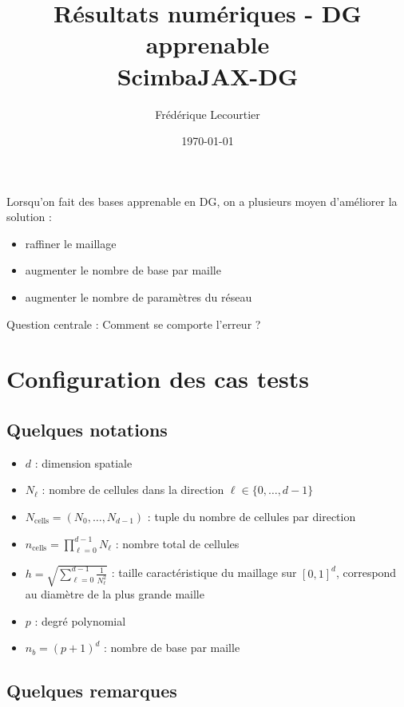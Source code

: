 \documentclass[12pt,a4paper]{article}
\title{\textbf{Résultats numériques - DG apprenable}\\
\large ScimbaJAX-DG}
\author{Frédérique Lecourtier}
\date{\today}
\begin{document}
\maketitle

Lorsqu'on fait des bases apprenable en DG, on a plusieurs moyen d'améliorer la solution :
\begin{itemize}
    \item raffiner le maillage
    \item augmenter le nombre de base par maille
    \item augmenter le nombre de paramètres du réseau
\end{itemize}

Question centrale : Comment se comporte l'erreur ?

\tableofcontents

\newpage
\section{Configuration des cas tests}

\subsection{Quelques notations}

\begin{itemize}
    \item $d$ : dimension spatiale
    \item $N_\ell$ : nombre de cellules dans la direction $\ell \in \{0,\ldots,d-1\}$
    \item $N_\text{cells} = (N_0, \ldots, N_{d-1})$ : tuple du nombre de cellules par direction
    \item $n_\text{cells} = \prod_{\ell=0}^{d-1} N_\ell$ : nombre total de cellules
    \item $h = \sqrt{\sum_{\ell=0}^{d-1} \frac{1}{N_\ell^2}}$ : taille caractéristique du maillage sur $[0,1]^d$, correspond au diamètre de la plus grande maille
\end{itemize}

\begin{itemize}
    \item $p$ : degré polynomial
    \item $n_b = (p+1)^d$ : nombre de base par maille
\end{itemize}

\subsection{Quelques remarques}
\end{document}
